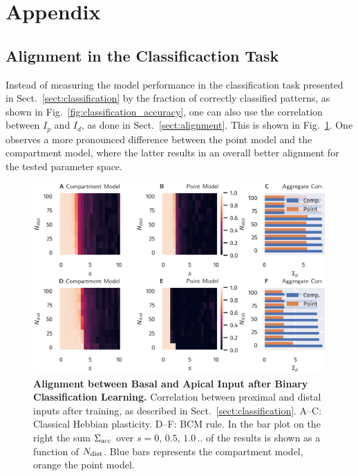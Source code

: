 \documentclass[utf8]{frontiersSCNS} %
\begin{document}
\section{Appendix}

\subsection{Alignment in the Classificaction Task}
Instead of measuring the model performance in the classification 
task presented in Sect.~\ref{sect:classification} by the fraction
of correctly classified patterns, 
as shown in Fig.~\ref{fig:classification_accuracy},
one can also use the correlation between $I_p$ and $I_d$, 
as done in Sect.~\ref{sect:alignment}. This is shown 
in Fig.~\ref{fig:classification_correlation}.
One observes a more pronounced difference between 
the point model and the compartment model, where 
the latter results in an overall better alignment 
for the tested parameter space.

\begin{figure}[t]
\centering
\includegraphics[width=1.0\columnwidth]{classification_correlation_dimension_scaling_high_input_dim_composite}
\caption{{\bf Alignment between Basal and Apical Input 
after Binary Classification Learning.}
Correlation between proximal and distal inputs
after training, as described in Sect.~\ref{sect:classification}. 
A--C: Classical Hebbian plasticity. 
D--F: BCM rule.
In the bar plot on the right the sum
$\Sigma_{\rm acc}$ over $s=0,\,0.5,\,1.0\,..$ 
of the results is shown as a function
of $N_{\rm dist}$. Blue bars represents 
the compartment model, orange the point model.}
\label{fig:classification_correlation}
\end{figure}
\newpage
\end{document}
